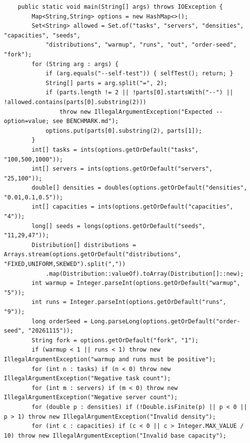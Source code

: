 \documentclass[conference]{IEEEtran}
\theoremstyle{definition}
\theoremstyle{remark}
\begin{document}
\begin{lstlisting}
    public static void main(String[] args) throws IOException {
        Map<String,String> options = new HashMap<>();
        Set<String> allowed = Set.of("tasks", "servers", "densities", "capacities", "seeds",
            "distributions", "warmup", "runs", "out", "order-seed", "fork");
        for (String arg : args) {
            if (arg.equals("--self-test")) { selfTest(); return; }
            String[] parts = arg.split("=", 2);
            if (parts.length != 2 || !parts[0].startsWith("--") || !allowed.contains(parts[0].substring(2)))
                throw new IllegalArgumentException("Expected --option=value; see BENCHMARK.md");
            options.put(parts[0].substring(2), parts[1]);
        }
        int[] tasks = ints(options.getOrDefault("tasks", "100,500,1000"));
        int[] servers = ints(options.getOrDefault("servers", "25,100"));
        double[] densities = doubles(options.getOrDefault("densities", "0.01,0.1,0.5"));
        int[] capacities = ints(options.getOrDefault("capacities", "4"));
        long[] seeds = longs(options.getOrDefault("seeds", "11,29,47"));
        Distribution[] distributions = Arrays.stream(options.getOrDefault("distributions", "FIXED,UNIFORM,SKEWED").split(","))
            .map(Distribution::valueOf).toArray(Distribution[]::new);
        int warmup = Integer.parseInt(options.getOrDefault("warmup", "5"));
        int runs = Integer.parseInt(options.getOrDefault("runs", "9"));
        long orderSeed = Long.parseLong(options.getOrDefault("order-seed", "20261115"));
        String fork = options.getOrDefault("fork", "1");
        if (warmup < 1 || runs < 1) throw new IllegalArgumentException("warmup and runs must be positive");
        for (int n : tasks) if (n < 0) throw new IllegalArgumentException("Negative task count");
        for (int m : servers) if (m < 0) throw new IllegalArgumentException("Negative server count");
        for (double p : densities) if (!Double.isFinite(p) || p < 0 || p > 1) throw new IllegalArgumentException("Invalid density");
        for (int c : capacities) if (c < 0 || c > Integer.MAX_VALUE / 10) throw new IllegalArgumentException("Invalid base capacity");


\end{lstlisting}
\end{document}
